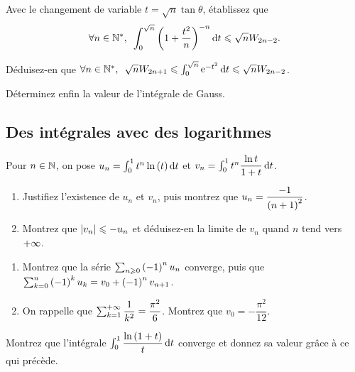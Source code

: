 \begin{q}
Avec le changement de variable \(t=\sqrt{n}\tan\theta\), établissez que \[\quantifs{\forall n\in\Ns}\int_0^{\sqrt{n}}\paren{1+\dfrac{t^2}{n}}^{-n}\odif{t}\leq\sqrt{n}W_{2n-2}.\]

Déduisez-en que \(\quantifs{\forall n\in\Ns}\sqrt{n}W_{2n+1}\leq\int_0^{\sqrt{n}}\e{-t^2}\odif{t}\leq\sqrt{n}W_{2n-2}\).
\end{q}

\begin{q}
Déterminez enfin la valeur de l'intégrale de Gauss.
\end{q}

\subsection*{Des intégrales avec des logarithmes}

Pour \(n\in\mathbb{N}\), on pose \(u_n=\int_0^1t^n\ln\paren{t}\odif{t}\) et \(v_n=\int_0^1t^n\dfrac{\ln t}{1+t}\odif{t}\).

\begin{q}
\begin{enumerate}
    \item Justifiez l'existence de \(u_n\) et \(v_n\), puis montrez que \(u_n=\dfrac{-1}{\left(n+1\right)^2}\). \\
    \item Montrez que \(\left\lvert v_n\right\rvert\leqslant-u_n\) et déduisez-en la limite de \(v_n\) quand \(n\) tend vers \(+\infty\).
\end{enumerate}
\end{q}

\begin{q}
\begin{enumerate}
    \item Montrez que la série \(\sum_{n\geqslant0}\left(-1\right)^nu_n\) converge, puis que \(\sum_{k=0}^n\left(-1\right)^ku_k=v_0+\left(-1\right)^nv_{n+1}\). \\
    \item On rappelle que \(\sum_{k=1}^{+\infty}\dfrac{1}{k^2}=\dfrac{\pi^2}{6}\). Montrez que \(v_0=-\dfrac{\pi^2}{12}\).
\end{enumerate}
\end{q}

\begin{q}
Montrez que l'intégrale \(\int_0^1\dfrac{\ln\paren{1+t}}{t}\odif{t}\) converge et donnez sa valeur grâce à ce qui précède.
\end{q}

